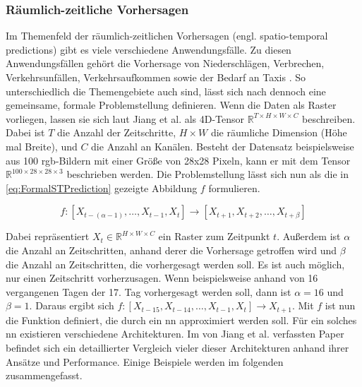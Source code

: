 \subsubsection{Räumlich-zeitliche Vorhersagen}
\label{sec:STPredictions}
Im Themenfeld der räumlich-zeitlichen Vorhersagen (engl. spatio-temporal predictions) gibt es viele verschiedene Anwendungsfälle.
Zu diesen Anwendungsfällen gehört die Vorhersage von Niederschlägen, Verbrechen, Verkehrsunfällen, Verkehrsaufkommen sowie der Bedarf an Taxis \cite{ConvLSTM,CrimeConvLSTM,CrimeSTResNet,HeteroConvLSTM,TrafficVolumeGraphDCRNN,STResNetOriginal}.
So unterschiedlich die Themengebiete auch sind, lässt sich nach \cite{DLTraff} dennoch eine gemeinsame, formale Problemstellung definieren.
Wenn die Daten als Raster vorliegen, lassen sie sich laut Jiang et al. als 4D-Tensor $\mathbb{R}^{T \times H \times W \times C}$ beschreiben.
Dabei ist $T$ die Anzahl der Zeitschritte, $H \times W$ die räumliche Dimension (Höhe mal Breite), und $C$ die Anzahl an Kanälen.
Besteht der Datensatz beispielsweise aus 100 \acrshort{rgb}-Bildern mit einer Größe von 28x28 Pixeln, kann er mit dem Tensor $\mathbb{R}^{100 \times 28 \times 28 \times 3}$ beschrieben werden.
Die Problemstellung lässt sich nun als die in \autoref{eq:FormalSTPrediction} gezeigte Abbildung $f$ formulieren.

\begin{equation}
    f: [X_{t-(\alpha-1)}, \dots, X_{t-1}, X_t] \to [X_{t+1}, X_{t+2}, \dots, X_{t+\beta}]
\label{eq:FormalSTPrediction}
\end{equation}

Dabei repräsentiert $X_t \in \mathbb{R}^{H \times W \times C}$ ein Raster zum Zeitpunkt $t$.
Außerdem ist $\alpha$ die Anzahl an Zeitschritten, anhand derer die Vorhersage getroffen wird und $\beta$ die Anzahl an Zeitschritten, die vorhergesagt werden soll.
Es ist auch möglich, nur einen Zeitschritt vorherzusagen.
Wenn beispielsweise anhand von 16 vergangenen Tagen der 17. Tag vorhergesagt werden soll, dann ist $\alpha = 16$ und $\beta = 1$.
Daraus ergibt sich $f: [X_{t-15}, X_{t-14}, \dots, X_{t-1}, X_t] \to X_{t+1}$.
Mit $f$ ist nun die Funktion definiert, die durch ein \acrshort{nn} approximiert werden soll.
Für ein solches \acrshort{nn} existieren verschiedene Architekturen.
Im von Jiang et al. verfassten Paper \cite{DLTraff} befindet sich ein detaillierter Vergleich vieler dieser Architekturen anhand ihrer Ansätze und Performance.
Einige Beispiele werden im folgenden zusammengefasst.

